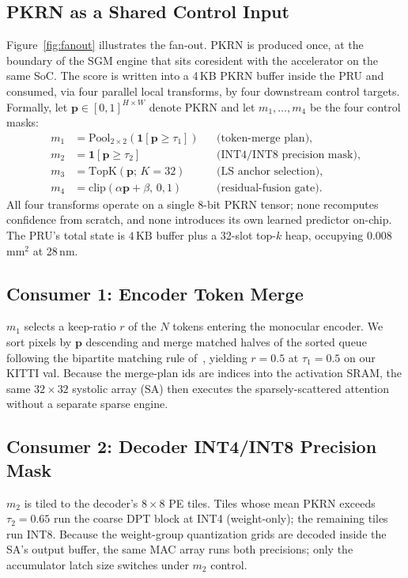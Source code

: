 \documentclass[journal,twocolumn]{IEEEtran}
\begin{document}
\subsection{PKRN as a Shared Control Input}
\label{sec:shared}
Figure~\ref{fig:fanout} illustrates the fan-out. PKRN is produced once, at the boundary of the SGM engine that sits coresident with the accelerator on the same SoC. The score is written into a 4\,KB PKRN buffer inside the PRU and consumed, via four parallel local transforms, by four downstream control targets. Formally, let $\mathbf{p}\!\in\![0,1]^{H\times W}$ denote PKRN and let $m_1{,}{\ldots}{,}m_4$ be the four control masks:
\begin{align}
m_1 &= \mathrm{Pool}_{2{\times}2}(\mathbf{1}[\mathbf{p} \geq \tau_1])
   &&\text{(token-merge plan)}, \label{eq:m1}\\
m_2 &= \mathbf{1}[\mathbf{p} \geq \tau_2]
   &&\text{(INT4/INT8 precision mask)}, \\
m_3 &= \mathrm{TopK}(\mathbf{p};\,K{=}32)
   &&\text{(LS anchor selection)}, \\
m_4 &= \mathrm{clip}(\alpha \mathbf{p} + \beta,\,0,1)
   &&\text{(residual-fusion gate)}.
\end{align}
All four transforms operate on a single 8-bit PKRN tensor; none recomputes confidence from scratch, and none introduces its own learned predictor on-chip. The PRU's total state is $4\,\mathrm{KB}$ buffer plus a 32-slot top-$k$ heap, occupying 0.008\,mm$^2$ at 28\,nm.

\subsection{Consumer 1: Encoder Token Merge}
$m_1$ selects a keep-ratio $r$ of the $N$ tokens entering the monocular encoder. We sort pixels by $\mathbf{p}$ descending and merge matched halves of the sorted queue following the bipartite matching rule of~\cite{bolya2023tome}, yielding $r\!=\!0.5$ at $\tau_1\!=\!0.5$ on our KITTI val. Because the merge-plan ids are indices into the activation SRAM, the same $32\!\times\!32$ systolic array (SA) then executes the sparsely-scattered attention without a separate sparse engine.

\subsection{Consumer 2: Decoder INT4/INT8 Precision Mask}
$m_2$ is tiled to the decoder's $8\!\times\!8$ PE tiles. Tiles whose mean PKRN exceeds $\tau_2\!=\!0.65$ run the coarse DPT block at INT4 (weight-only); the remaining tiles run INT8. Because the weight-group quantization grids are decoded inside the SA's output buffer, the same MAC array runs both precisions; only the accumulator latch size switches under $m_2$ control.
\end{document}
